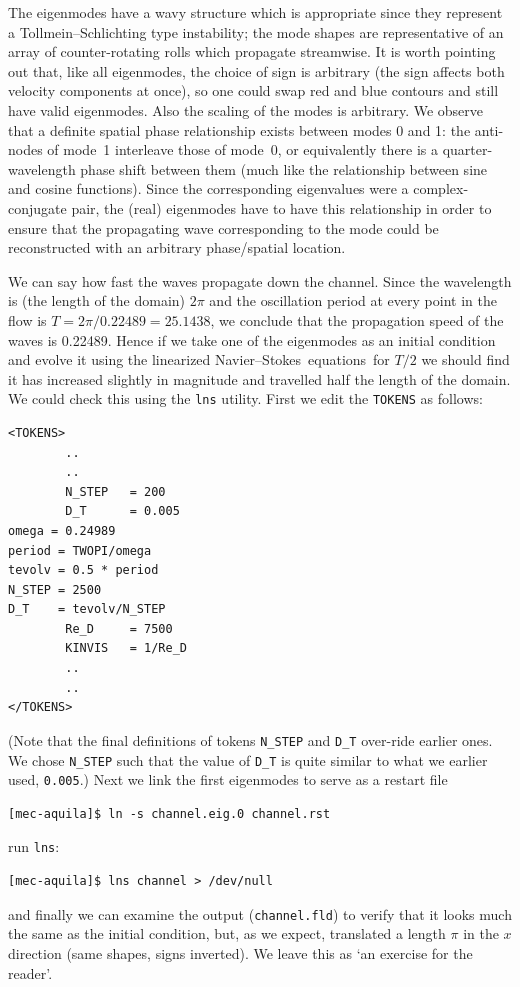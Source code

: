 \documentclass[11pt,a4paper]{report}
\newcommand\NavSto{Navier--Stokes}
\newcommand\LNS{linearized \NavSto}
\newcommand\LNSE{\LNS\ equations}
\begin{document}
The eigenmodes have a wavy structure which is appropriate since they
represent a Tollmein--Schlichting type instability; the mode shapes
are representative of an array of counter-rotating rolls which
propagate streamwise.  It is worth pointing out that, like all
eigenmodes, the choice of sign is arbitrary (the sign affects both
velocity components at once), so one could swap red and blue contours
and still have valid eigenmodes.  Also the scaling of the modes is
arbitrary.  We observe that a definite spatial phase relationship
exists between modes 0 and 1: the anti-nodes of mode~1 interleave those
of mode~0, or equivalently there is a quarter-wavelength phase shift
between them (much like the relationship between sine and cosine
functions).  Since the corresponding eigenvalues were a
complex-conjugate pair, the (real) eigenmodes have to have this
relationship in order to ensure that the propagating wave
corresponding to the mode could be reconstructed with an arbitrary
phase/spatial location.

We can say how fast the waves propagate down the channel.  Since the
wavelength is (the length of the domain) $2\pi$ and the oscillation
period at every point in the flow is $T=2\pi/0.22489=25.1438$, we
conclude that the propagation speed of the waves is 0.22489.  Hence if
we take one of the eigenmodes as an initial condition and evolve it
using the \LNSE\ for $T/2$ we should find it has increased slightly in
magnitude and travelled half the length of the domain.  We could check
this using the \verb+lns+ utility.  First we edit the \verb+TOKENS+ as
follows:
{\small
\begin{verbatim}
<TOKENS>
        ..
        ..
        N_STEP   = 200
        D_T      = 0.005
omega = 0.24989
period = TWOPI/omega
tevolv = 0.5 * period
N_STEP = 2500
D_T    = tevolv/N_STEP
        Re_D     = 7500
        KINVIS   = 1/Re_D
        ..
        ..
</TOKENS>
\end{verbatim}
} \noindent (Note that the final definitions of tokens \verb+N_STEP+
and \verb+D_T+ over-ride earlier ones. We chose \verb+N_STEP+ such
that the value of \verb+D_T+ is quite similar to what we earlier used,
\verb+0.005+.)  Next we link the first eigenmodes to serve as a
restart file {\small
\begin{verbatim}
[mec-aquila]$ ln -s channel.eig.0 channel.rst
\end{verbatim}
}
\noindent
run \verb+lns+:
{\small
\begin{verbatim}
[mec-aquila]$ lns channel > /dev/null
\end{verbatim}
}
\noindent and finally we can examine the output (\verb+channel.fld+)
to verify that it looks much the same as the initial condition, but,
as we expect, translated a length $\pi$ in the $x$ direction (same
shapes, signs inverted). We leave this as `an exercise for the
reader'.
\end{document}
